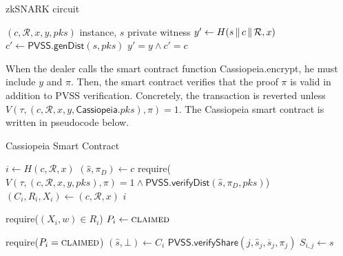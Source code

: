\begin{algorithm}
    \caption{zkSNARK circuit}
    \label{alg:snark_circuit}
    \begin{algorithmic}[1]
        \Require $(c, \mathcal{R}, x, y, pks)$ instance, $s$ private witness
        \State $y' \gets H(s \,\|\, c \,\|\, \mathcal{R}, x)$
        \State $c' \gets \textsf{PVSS.genDist}(s, pks)$
        \State \Return $y' = y \land c' = c$
    \end{algorithmic}
\end{algorithm}

When the dealer calls the smart contract function \textsf{Cassiopeia.encrypt}, he must include $y$ and $\pi$.
Then, the smart contract verifies that the proof $\pi$ is valid in addition to PVSS verification.
Concretely, the transaction is reverted unless $V(\tau, (c, \mathcal{R}, x, y, \textsf{Cassiopeia}.pks), \pi) = 1$.
The Cassiopeia smart contract is written in pseudocode below.

\begin{algorithm}[H]
\caption{Cassiopeia Smart Contract}
\label{cassiopeia_no_incentives}
    \begin{algorithmic}[1]
            
            \EndFunction
            
                \State $i \gets H(c, \mathcal{R}, x)$
                \State $(\hat{s}, \pi_D) \gets c$
                \State require($V(\tau, (c, \mathcal{R}, x, y, pks), \pi) = 1 \land \textsf{PVSS.verifyDist}(\hat{s}, \pi_D, pks)$)
                \State $(C_i, R_i, X_i) \gets (c, \mathcal{R}, x)$
                \State \Return $i$
            \EndFunction
            
                \State require($(X_i, w) \in  R_i$)
                \State $P_i \gets \textsc{claimed}$
            \EndFunction
            
                \State require($P_i = \textsc{claimed}$)
                \State $(\hat{s}, \bot) \gets C_i$
                \State $\textsf{PVSS.verifyShare}(j, \hat{s}_j, \overline{s}_j, \pi_j)$
                \State $S_{i,j} \gets s$
            \EndFunction
        \EndContract
    \end{algorithmic}
\end{algorithm}
